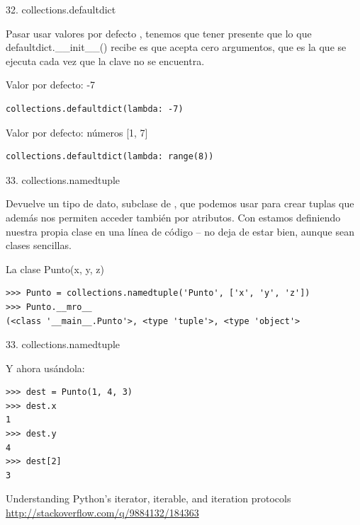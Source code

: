 \documentclass[14pt]{beamer}
\begin{document}
\begin{frame}[fragile]{32. collections.defaultdict}
  \small
  \begin{block}{}
    \centering
    Pasar usar valores por defecto , tenemos que tener presente que lo que
    defaultdict.\_\_init\_\_() recibe es  que
    acepta cero argumentos, que es la que se ejecuta cada vez que la
    clave no se encuentra.
  \end{block}

  \begin{exampleblock}
    {Valor por defecto: -7}
    \begin{lstlisting}
collections.defaultdict(lambda: -7)
    \end{lstlisting}
  \end{exampleblock}

  \begin{exampleblock}
    {Valor por defecto: números [1, 7]}
    \begin{lstlisting}
collections.defaultdict(lambda: range(8))
    \end{lstlisting}
  \end{exampleblock}
\end{frame}

\begin{frame}[fragile]{33. collections.namedtuple}
  \small
  \begin{block}{}
    \centering
    Devuelve un tipo de dato, subclase de , que
    podemos usar para crear tuplas que además nos permiten acceder
    también por atributos.  Con  estamos
    definiendo nuestra propia clase en una línea de código -- no deja
    de estar bien, aunque sean clases sencillas.
  \end{block}

  \scriptsize
  \begin{exampleblock}
    {\footnotesize La clase Punto(x, y, z)}
    \begin{lstlisting}
>>> Punto = collections.namedtuple('Punto', ['x', 'y', 'z'])
>>> Punto.__mro__
(<class '__main__.Punto'>, <type 'tuple'>, <type 'object'>
    \end{lstlisting}
  \end{exampleblock}
\end{frame}

\begin{frame}[fragile]{33. collections.namedtuple}
  \small
  \begin{exampleblock}
    {Y ahora usándola:}
    \begin{lstlisting}
>>> dest = Punto(1, 4, 3)
>>> dest.x
1
>>> dest.y
4
>>> dest[2]
3
    \end{lstlisting}
  \end{exampleblock}

  \begin{block}
    {\centering Understanding Python's iterator, iterable, and iteration protocols}
    \centering \url{http://stackoverflow.com/q/9884132/184363}
  \end{block}
\end{frame}
\end{document}
